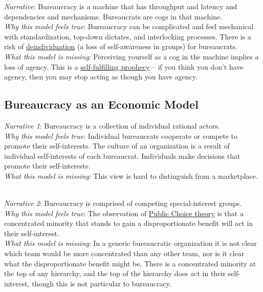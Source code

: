 \textit{Narrative}: Bureaucracy is a machine that has throughput and latency and dependencies and mechanisms. Bureaucrats are cogs in that machine.\\
\textit{Why this model feels true}: Bureaucracy can be complicated and feel mechanical with standardization, top-down dictates, and interlocking processes. There is a risk of \href{https://en.wikipedia.org/wiki/Deindividuation}{deindividuation} (a loss of self-awareness in groups)
\iftoggle{WPinmargin}{\marginpar{$>$Wikipedia: deindividuation}}{}
for bureaucrats. \\
\textit{What this model is missing}: Perceiving yourself as a cog in the machine implies a loss of agency. This is a \href{https://en.wikipedia.org/wiki/Self-fulfilling_prophecy}{self-fulfilling prophecy}
\iftoggle{WPinmargin}{\marginpar{$>$Wikipedia: self-fulfilling prophecy}}{}
-- if you think you don't have agency, then you may stop acting as though you have agency. 


\subsection*{Bureaucracy as an Economic Model}

\textit{Narrative 1}: Bureaucracy is a collection of individual rational actors. \\
\textit{Why this model feels true}: Individual bureaucrats cooperate or compete to promote their self-interests.
The culture of an organization is a result of individual self-interests of each bureaucrat.
Individuals make decisions that promote their self-interests. \\
\textit{What this model is missing}: This view is hard to distinguish from a marketplace. 

\ \\
\textit{Narrative 2}: Bureaucracy is comprised of competing special-interest groups. \\
\textit{Why this model feels true}: The observation of \href{https://en.wikipedia.org/wiki/Public_choice}{Public Choice theory} 
\iftoggle{WPinmargin}{\marginpar{$>$Wikipedia: Public Choice theory}}{}
is that a concentrated minority that stands to gain a disproportionate benefit will act in their self-interest. \\
\textit{What this model is missing}: In a generic bureaucratic organization it is not clear which team would be more concentrated than any other team, nor is it clear what the disproportionate benefit might be. There is a concentrated minority at the top of any hierarchy, and the top of the hierarchy does act in their self-interest, though this is not particular to bureaucracy.

